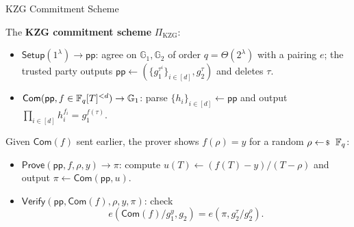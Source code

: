 \documentclass{zkdl-presentation-template}
\begin{document}
    \begin{frame}{KZG Commitment Scheme}
        \small
        \begin{definition}
            The \textbf{KZG commitment scheme} $\Pi_{\text{KZG}}$:
            \begin{itemize}
                \item $\mathsf{Setup}(1^{\lambda}) \to \mathsf{pp}$: agree on $\mathbb{G}_1, \mathbb{G}_2$ of order $q = \Theta(2^{\lambda})$ with a pairing $e$; the trusted party outputs $\mathsf{pp} \gets (\{g_1^{\tau^i}\}_{i \in [d]}, g_2^{\tau})$ and deletes $\tau$.\pause
                \item $\mathsf{Com}(\mathsf{pp}, f \in \mathbb{F}_q[T]^{<d}) \to \mathbb{G}_1$: parse $\{h_i\}_{i \in [d]} \gets \mathsf{pp}$ and output $\prod_{i \in [d]} h_i^{f_i} = g_1^{f(\tau)}$.
            \end{itemize}
        \end{definition}
        \pause

        \begin{definition}
            Given $\mathsf{Com}(f)$ sent earlier, the prover shows $f(\rho) = y$ for a random $\rho \leftarrowS \F_q$:
            \begin{itemize}
                \item $\mathsf{Prove}(\mathsf{pp}, f, \rho, y) \to \pi$: compute $u(T) \gets (f(T) - y)/(T - \rho)$ and output $\pi \gets \mathsf{Com}(\mathsf{pp}, u)$.\pause
                \item $\mathsf{Verify}(\mathsf{pp}, \mathsf{Com}(f), \rho, y, \pi)$: check
                \begin{equation*}
                    e(\mathsf{Com}(f)/g_1^{y}, g_2) = e(\pi, g_2^{\tau}/g_2^{\rho}).
                \end{equation*}
            \end{itemize}
        \end{definition}
    \end{frame}
\end{document}

